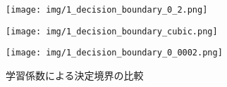 \documentclass[a4paper,12pt]{jsarticle}
\begin{document}
\begin{figure}[htbp]
  \centering
  \begin{minipage}[b]{0.325\linewidth}
    \centering
    \texttt{[image: img/1\_decision\_boundary\_0\_2.png]}
    \label{fig:1_decision_boundary_0_2}
  \end{minipage}
  \begin{minipage}[b]{0.325\linewidth}
    \centering
    \texttt{[image: img/1\_decision\_boundary\_cubic.png]}
    \label{fig:1_decision_boundary_0_002}
  \end{minipage}
  \begin{minipage}[b]{0.325\linewidth}
    \centering
    \texttt{[image: img/1\_decision\_boundary\_0\_0002.png]}
    \label{fig:1_decision_boundary_0_0002}
  \end{minipage}
  \caption{学習係数による決定境界の比較}
  \label{fig:1_decision_boundary_learning_rate}
\end{figure}
\end{document}
